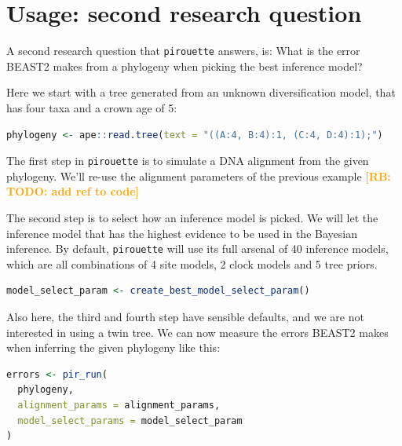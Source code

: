 \documentclass{article}
\newcommand{\richel}[1]{\textcolor{orange}{\textbf{[RB: #1]}}}
\begin{document}
\section{Usage: second research question}

A second research question that \verb;pirouette; answers, is:
What is the error BEAST2 makes from a phylogeny when
picking the best inference model?

Here we start with a tree generated from an unknown 
diversification model, that has four taxa and a crown age of 5:

\begin{lstlisting}[language=R, floatplacement=H, frame=single]
phylogeny <- ape::read.tree(text = "((A:4, B:4):1, (C:4, D:4):1);")
\end{lstlisting}

The first step in \verb;pirouette; is to simulate a DNA alignment from the 
given phylogeny. We'll re-use the alignment parameters of the previous example 
\richel{TODO: add ref to code}
 
The second step is to select how an inference model is picked.
We will let the inference model that has the highest evidence to be used
in the Bayesian inference. By default, \verb;pirouette; will use
its full arsenal of 40 inference models, which are all combinations of 4 site 
models, 2 clock models and 5 tree priors.

\begin{lstlisting}[language=R, floatplacement=H, frame=single]
model_select_param <- create_best_model_select_param()
\end{lstlisting}

Also here, the third and fourth step have sensible defaults, and we are not
interested in using a twin tree. We can now measure the errors BEAST2
makes when inferring the given phylogeny like this:

\begin{lstlisting}[language=R, floatplacement=H, frame=single]
errors <- pir_run(
  phylogeny,
  alignment_params = alignment_params,
  model_select_params = model_select_param
)
\end{lstlisting}
\end{document}
